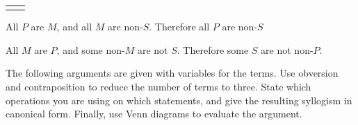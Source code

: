 {\begin{exercises}
{\begin{longtabu}{X[1,l,m]X[1,l,m]}
\begin{venns}
\end{venns}
\end{longtabu}
}
\item All $P$ are $M$, and all $M$ are non-$S$. Therefore all $P$ are non-$S$


\item All $M$ are $P$, and some non-$M$ are not $S$. Therefore some $S$ are not non-$P$. 

\end{exercises}	
\noindent\problempart The following arguments are given with variables for the terms. Use obversion and contraposition to reduce the number of terms to three. State which operations you are using on which statements, and give the resulting syllogism in canonical form. Finally, use Venn diagrams to evaluate the argument.
\begin{exercises} 


\end{exercises}}
